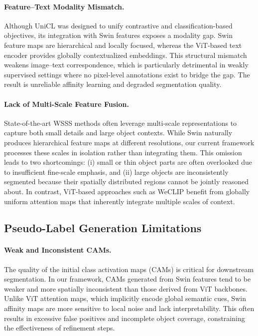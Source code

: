 \paragraph{Feature–Text Modality Mismatch.}
Although UniCL was designed to unify contrastive and classification-based objectives, its integration with Swin features exposes a modality gap. Swin feature maps are hierarchical and locally focused, whereas the ViT-based text encoder provides globally contextualized embeddings. This structural mismatch weakens image–text correspondence, which is particularly detrimental in weakly supervised settings where no pixel-level annotations exist to bridge the gap. The result is unreliable affinity learning and degraded segmentation quality.

\paragraph{Lack of Multi-Scale Feature Fusion.}
State-of-the-art WSSS methods often leverage multi-scale representations to capture both small details and large object contexts. While Swin naturally produces hierarchical feature maps at different resolutions, our current framework processes these scales in isolation rather than integrating them. This omission leads to two shortcomings: (i) small or thin object parts are often overlooked due to insufficient fine-scale emphasis, and (ii) large objects are inconsistently segmented because their spatially distributed regions cannot be jointly reasoned about. In contrast, ViT-based approaches such as WeCLIP benefit from globally uniform attention maps that inherently integrate multiple scales of context.

\subsection{Pseudo-Label Generation Limitations}

\paragraph{Weak and Inconsistent CAMs.}
The quality of the initial class activation maps (CAMs) is critical for downstream segmentation. In our framework, CAMs generated from Swin features tend to be weaker and more spatially inconsistent than those derived from ViT backbones. Unlike ViT attention maps, which implicitly encode global semantic cues, Swin affinity maps are more sensitive to local noise and lack interpretability. This often results in excessive false positives and incomplete object coverage, constraining the effectiveness of refinement steps.

